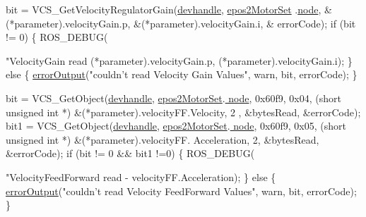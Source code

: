 \begin{DoxyCode}
{{        bit = VCS\_GetVelocityRegulatorGain(\hyperlink{classEpos2MotorController_a40594faab444bcba221ab9d55d1162cd}{devhandle}, \hyperlink{classEpos2MotorController_a0856f5fdd71ffa3b84a536afa085bfb1}{epos2MotorSet}
      .\hyperlink{structEpos2MotorController_1_1epos2Settings_ab8f18d3df17e8de9ed5250a3e53292c6}{node}, &(*parameter).velocityGain.p, &(*parameter).velocityGain.i, &
      errorCode);
        \textcolor{keywordflow}{if} (bit != 0) \{
            ROS\_DEBUG(\textcolor{stringliteral}{"VelocityGain read %
      (*parameter).velocityGain.p, (*parameter).velocityGain.i);
        \} \textcolor{keywordflow}{else} \{
            \hyperlink{classEpos2MotorController_a64d5e3e3858597c111e60ba8b382a63b}{errorOutput}(\textcolor{stringliteral}{"couldn't read Velocity Gain Values"}, warn, 
      bit, errorCode);
        \}

        bit  = VCS\_GetObject(\hyperlink{classEpos2MotorController_a40594faab444bcba221ab9d55d1162cd}{devhandle}, \hyperlink{classEpos2MotorController_a0856f5fdd71ffa3b84a536afa085bfb1}{epos2MotorSet}.\hyperlink{structEpos2MotorController_1_1epos2Settings_ab8f18d3df17e8de9ed5250a3e53292c6}{
      node}, 0x60f9, 0x04, (\textcolor{keywordtype}{short} \textcolor{keywordtype}{unsigned} \textcolor{keywordtype}{int} *) &(*parameter).velocityFF.Velocity, 2
      , &bytesRead, &errorCode);
        bit1 = VCS\_GetObject(\hyperlink{classEpos2MotorController_a40594faab444bcba221ab9d55d1162cd}{devhandle}, \hyperlink{classEpos2MotorController_a0856f5fdd71ffa3b84a536afa085bfb1}{epos2MotorSet}.\hyperlink{structEpos2MotorController_1_1epos2Settings_ab8f18d3df17e8de9ed5250a3e53292c6}{
      node}, 0x60f9, 0x05, (\textcolor{keywordtype}{short} \textcolor{keywordtype}{unsigned} \textcolor{keywordtype}{int} *) &(*parameter).velocityFF.
      Acceleration, 2, &bytesRead, &errorCode);
        \textcolor{keywordflow}{if} (bit != 0 && bit1 !=0) \{
            ROS\_DEBUG(\textcolor{stringliteral}{"VelocityFeedForward read %
       - %
      velocityFF.Acceleration);
        \} \textcolor{keywordflow}{else} \{
            \hyperlink{classEpos2MotorController_a64d5e3e3858597c111e60ba8b382a63b}{errorOutput}(\textcolor{stringliteral}{"couldn't read Velocity FeedForward Values"},
       warn, bit, errorCode);
        \}

}}}}
\end{DoxyCode}
